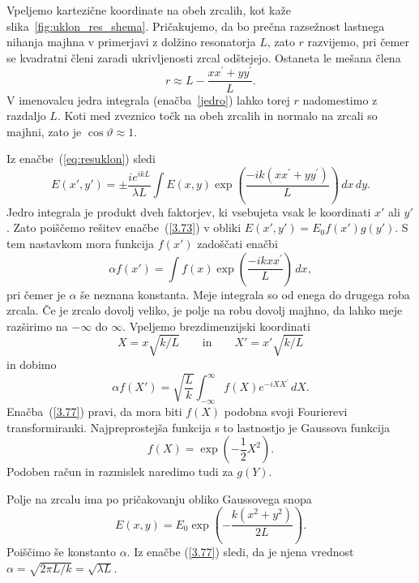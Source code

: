 Vpeljemo kartezične koordinate na obeh zrcalih, kot kaže slika~\ref{fig:uklon_res_shema}.
Pričakujemo, da bo prečna razsežnost lastnega nihanja majhna v primerjavi
z dolžino resonatorja $L$, zato $r$ razvijemo, pri čemer se kvadratni členi 
zaradi ukrivljenosti zrcal odštejejo. Ostaneta le mešana člena
\begin{equation}
r\approx L-\frac{xx^{\prime}+yy^{\prime}}{L}.
\label{3.72}
\end{equation}
V imenovalcu jedra integrala (enačba~\ref{jedro}) lahko torej $r$ nadomestimo
z razdaljo $L$. Koti med zveznico točk na obeh zrcalih in normalo na zrcali
so majhni, zato je  $\cos\vartheta \approx 1$. 

Iz enačbe~(\ref{eq:resuklon}) sledi
\begin{equation}
E(x',y')=\pm\frac{ie^{ikL}}{\lambda L}\int E(x,y)\exp
\left(\frac{-ik(xx^{\prime}+yy^{\prime})}{L}\right)\, dx\, dy.
\label{3.73}
\end{equation}
Jedro integrala je produkt dveh
faktorjev, ki vsebujeta vsak le koordinati $x'$ ali $y'$. Zato poiščemo
rešitev enačbe~(\ref{3.73}) v obliki  
$E(x',y')=E_{0}f(x')g(y')$.
S tem nastavkom mora funkcija $f(x')$ zadoščati enačbi
\begin{equation}
\alpha f(x')=\int f(x)\exp\left(\frac{-ikxx^{\prime}}{L}\right)\, dx,
\label{3.75}
\end{equation}
pri čemer je $\alpha$ še neznana konstanta. Meje integrala so od enega do 
drugega roba zrcala. Če je zrcalo dovolj veliko,
je polje na robu dovolj majhno, da lahko meje razširimo
na $-\infty$ do $\infty$. Vpeljemo brezdimenzijski koordinati
\begin{equation}
X=x\sqrt{k/L} \qquad \mathrm{in} \qquad X'=x'\sqrt{k/L}
\label{3.76}
\end{equation}
in dobimo
\begin{equation}
\alpha f(X')=\sqrt{\frac{L}{k}}\int_{-\infty}^{\infty}f(X)e^{-iXX^{\prime}}\, dX.
\label{3.77}
\end{equation}
Enačba~(\ref{3.77}) pravi, da mora
biti $f(X)$ podobna svoji Fourierevi transformiranki. Najpreprostejša
funkcija s to lastnostjo je Gaussova funkcija 
\begin{equation}
f(X)=\exp\left(-\frac{1}{2}X^{2}\right)\!.
\label{3.78}
\end{equation}
Podoben račun in razmislek naredimo tudi za $g(Y)$. 

Polje na zrcalu ima po pričakovanju obliko Gaussovega snopa
\begin{equation}
E(x,y)=E_{0}\exp\left(-\frac{k(x^{2}+y^{2})}{2L}\right)\!.
\label{3.79}
\end{equation}
Poiščimo še konstanto $\alpha$. Iz enačbe (\ref{3.77}) sledi, da je njena vrednost 
$\alpha = \sqrt{2\pi L/k}=\sqrt{\lambda L}$. 

